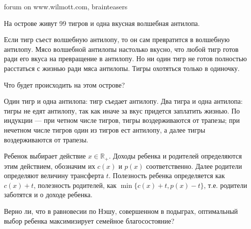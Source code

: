 \begin{problem}
\begin{source}
forum on www.wilmott.com, brainteasers
\end{source}
На острове живут 99 тигров и одна вкусная волшебная антилопа. \par
Если тигр съест волшебную антилопу, то он сам превратится в волшебную антилопу. Мясо волшебной антилопы настолько вкусно, что любой тигр готов ради его вкуса на превращение в антилопу. Но ни один тигр не готов полностью расстаться с жизнью ради мяса антилопы. Тигры охотяться только в одиночку.\par
Что будет происходить на этом острове? \par

\begin{sol}
 Один тигр и одна антилопа: тигр съедает антилопу.
 Два тигра и одна антилопа: тигры не едят антилопу,
 так как иначе за вкус придется заплатить жизнью. По индукции — при четном числе тигров,
 тигры воздерживаются от трапезы;
 при нечетном числе тигров один из тигров ест антилопу,
 а далее тигры воздерживаются от трапезы.
\end{sol}
\end{problem}





\begin{problem}
 Ребенок выбирает действие $x\in \mathbb{R}_{+}$. Доходы ребенка и
родителей определяются этим действием, обозначим их $c(x)$ и
$p(x)$ соответственно. Далее родители определяют величину
трансферта $t$. Полезность ребенка определяется как $c(x)+t$,
полезность родителей, как $\min\{c(x)+t,p(x)-t\}$, т.е. родители
заботятся и о доходе ребенка. \par
Верно ли, что в равновесии по Нэшу, совершенном в подыграх,
оптимальный выбор ребенка максимизирует семейное благосостояние?



\begin{sol}

\end{sol}
\end{problem}




